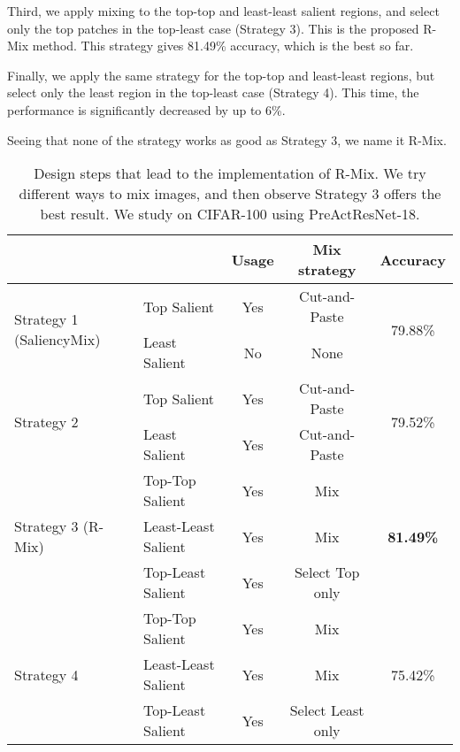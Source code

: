 \documentclass[letterpaper]{article} \usepackage[submission]{aaai23}  \usepackage{times}  \usepackage{helvet}  \usepackage{courier}  \usepackage[hyphens]{url}  \usepackage{graphicx} \urlstyle{rm} \def\UrlFont{\rm}  \usepackage{natbib}  \usepackage{caption} \frenchspacing  \setlength{\pdfpagewidth}{8.5in} \setlength{\pdfpageheight}{11in}
\begin{document}
Third, we apply mixing to the top-top and least-least salient regions, and select only the top patches in the top-least case (Strategy 3). This is the proposed R-Mix method. This strategy gives 81.49\% accuracy, which is the best so far.

Finally, we apply the same strategy for the top-top and least-least regions, but select only the least region in the top-least case (Strategy 4). This time, the performance is significantly decreased by up to 6\%.

Seeing that none of the strategy works as good as Strategy 3, we name it R-Mix.

\begin{table*}[h!]
\centering
\begin{tabular}{llccc}
\hline
 &  & Usage & Mix strategy & Accuracy \\ \hline
\multirow{2}{*}{Strategy 1 (SaliencyMix)} & Top Salient & Yes & Cut-and-Paste & \multirow{2}{*}{79.88\%} \\
 & Least Salient & No & None &  \\ \hline
\multirow{2}{*}{Strategy 2} & Top Salient & Yes & Cut-and-Paste & \multirow{2}{*}{79.52\%} \\
 & Least Salient & Yes & Cut-and-Paste &  \\ \hline
\multirow{3}{*}{Strategy 3 (R-Mix)} & Top-Top Salient & Yes & Mix & \multirow{3}{*}{\textbf{81.49\%}} \\
 & Least-Least Salient & Yes & Mix &  \\
 & Top-Least Salient & Yes & Select Top only &  \\ \hline
\multirow{3}{*}{Strategy 4} & Top-Top Salient & Yes & Mix & \multirow{3}{*}{75.42\%} \\
 & Least-Least Salient & Yes & Mix &  \\
 & Top-Least Salient & Yes & Select Least only & \\ \hline
\end{tabular}
\caption{Design steps that lead to the implementation of R-Mix. We try different ways to mix images, and then observe Strategy 3 offers the best result. We study on CIFAR-100 using PreActResNet-18.}
\label{tab:study}
\end{table*}
\end{document}
